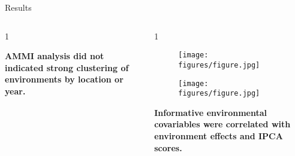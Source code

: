 \documentclass[final]{beamer}
\newlength{\onecolwid}
\newlength{\twocolwid}
\begin{document}
\begin{frame}[t]
\begin{columns}[t]
\begin{column}{\twocolwid}
\begin{block}{Results}
\begin{columns}[t,totalwidth=\twocolwid]
\begin{column}{1\onecolwid}
\vspace{0.5cm}

\begin{footnotesize}

\textbf{AMMI analysis did not indicated strong clustering of environments by location or year.}

\end{footnotesize}



\end{column} %


\begin{column}{1\onecolwid} %


\begin{figure}
  \begin{center}
  \begin{minipage}[m]{0.48\linewidth}
    \centering
    \texttt{[image: figures/figure.jpg]}
  \end{minipage}%
  \hspace{0.02\linewidth}
  \begin{minipage}[m]{0.48\linewidth}
    \centering
    \texttt{[image: figures/figure.jpg]}
  \end{minipage}%
\end{center}
\end{figure}


\begin{footnotesize}

\textbf{Informative environmental covariables were correlated with environment effects and IPCA scores.}

\end{footnotesize}



\end{column} %



\end{columns} %




\vspace{3cm}



\begin{columns}[t,totalwidth=\twocolwid] %


\end{columns}
\end{block}
\end{column}
\end{columns}
\end{frame}
\end{document}
